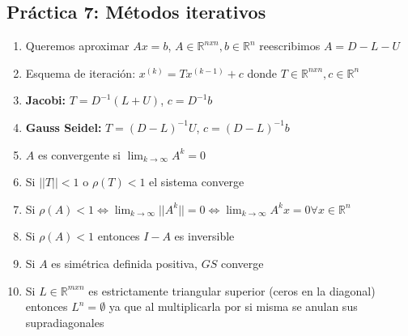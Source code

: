 \subsection*{Práctica 7: Métodos iterativos}
\begin{enumerate}
    \item Queremos aproximar $Ax=b$, $A\in \mathbb{R}^{nxn}, b\in\mathbb{R}^n$ reescribimos $A = D - L - U$
    \item Esquema de iteración: $x^{(k)} = Tx^{(k-1)} + c$ donde $T\in \mathbb{R}^{nxn}, c\in\mathbb{R}^n$
    \item \textbf{Jacobi:} $T = D^{-1}(L+U)$, $c = D^{-1}b$
    \item \textbf{Gauss Seidel:} $T = (D-L)^{-1}U$, $c = (D-L)^{-1}b$
    \item $A$ es convergente si $\lim_{k \to \infty} A^k = 0$
    \item Si $||T|| < 1$ o $\rho(T) < 1$ el sistema converge
    \item Si $\rho(A) < 1 \iff \lim_{k \to \infty} ||A^k|| = 0 \iff \lim_{k \to \infty} A^kx = 0 \forall x \in \mathbb{R}^n$
    \item Si $\rho(A) < 1$ entonces $I-A$ es inversible
    \item Si $A$ es simétrica definida positiva, $GS$ converge

    \item Si $L \in \mathbb{R}^{mxn}$ es estrictamente triangular superior (ceros en la diagonal) entonces $L^n = \emptyset$ ya que al multiplicarla por si misma se anulan sus supradiagonales
\end{enumerate}

